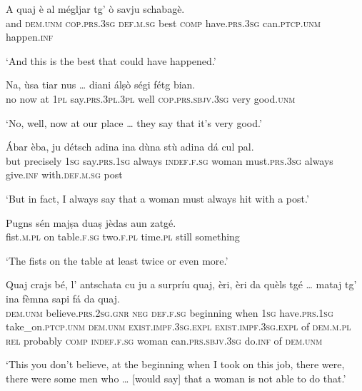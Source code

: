 \begin{linenumbers}
\gll A quaj è al mégljar tg’ ò savju schabagè.   \\
and \textsc{dem.unm} \textsc{cop.prs.3sg} \textsc{def.m.sg} best \textsc{comp} have.\textsc{prs.3sg} can.\textsc{ptcp.unm} happen.\textsc{inf} \\
\end{linenumbers}
\medskip
\glt `And this is the best that could have happened.'
\medskip

\begin{linenumbers}
\gll   Na, ùsa tiar nus … diani álṣò ségi fétg bian. \\
no now at \textsc{1pl} {} say.\textsc{prs.3pl.3pl} well \textsc{cop.prs.sbjv.3sg} very good.\textsc{unm} \\
\end{linenumbers}
\medskip
\glt `No, well, now at our place … they say that it’s very good.'
\medskip

\begin{linenumbers}
\gll Ábar èba, ju détsch adina ina dùna stù adina dá cul pal.\\
but precisely \textsc{1sg} say.\textsc{prs.1sg} always \textsc{indef.f.sg} woman must.\textsc{prs.3sg} always give.\textsc{inf} with.\textsc{def.m.sg} post\\
\end{linenumbers}
\medskip
\glt `But in fact, I always say that a woman must always hit with a post.'
\medskip

\begin{linenumbers}
\gll Pugns sén majṣa duaṣ jèdas aun zatgé.   \\
 fist.\textsc{m.pl} on table.\textsc{f.sg} two.\textsc{f.pl} time.\textsc{pl} still something\\
\end{linenumbers}
\medskip
\glt `The fists on the table at least twice or even more.'
\medskip

\begin{linenumbers}
\gll  Quaj crajs bé, l’ antschata cu ju a surpríu quaj, èri, èri da quèls tgé … mataj\footnotemark{} tg’ ina fèmna sapi fá da quaj.\\
 \textsc{dem.unm} believe.\textsc{prs.2sg.gnr} \textsc{neg} \textsc{def.f.sg} beginning when \textsc{1sg} have.\textsc{prs.1sg} take\_on.\textsc{ptcp.unm} \textsc{dem.unm} \textsc{exist.impf.3sg.expl} \textsc{exist.impf.3sg.expl} of \textsc{dem.m.pl} \textsc{rel} {} probably \textsc{comp} \textsc{indef.f.sg} woman can.\textsc{prs.sbjv.3sg} do.\textsc{inf} of \textsc{dem.unm}\\
\end{linenumbers}
\medskip
\glt `This you don’t believe, at the beginning when I took on this job, there were, there were some men who … [would say] that a woman is not able to do that.'
\medskip

